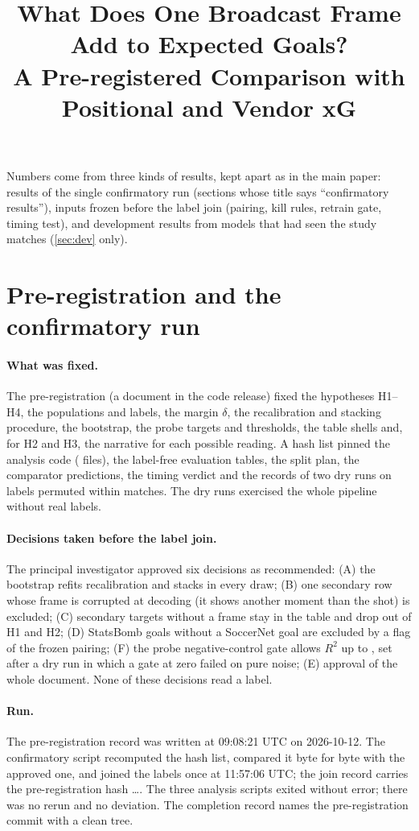 \documentclass[10pt,twocolumn,letterpaper]{article}
\title{What Does One Broadcast Frame Add to Expected Goals?\\A Pre-registered Comparison with Positional and Vendor xG}
\newcommand{\Hone}{H1\xspace}\newcommand{\Htwo}{H2\xspace}\newcommand{\Hthree}{H3\xspace}\newcommand{\Hfour}{H4\xspace}
\begin{document}
\maketitlesupplementary

Numbers come from three kinds of results, kept apart as in the main paper: results of the single confirmatory run (sections whose title says
``confirmatory results''), inputs frozen before the label join (pairing, kill rules, retrain gate, timing test), and
development results from models that had seen the study matches (\cref{sec:dev} only).

\section{Pre-registration and the confirmatory run}
\label{sec:prereg}

\paragraph{What was fixed.} The pre-registration (a document in the code release) fixed the hypotheses \Hone--\Hfour,
the populations and labels, the margin $\delta$, the recalibration and stacking procedure, the bootstrap, the probe
targets and thresholds, the table shells and, for \Htwo and \Hthree, the narrative for each possible reading. A hash
list pinned the analysis code ( files), the label-free evaluation tables, the split plan, the
comparator predictions, the timing verdict and the records of two dry runs on labels permuted within matches. The dry
runs exercised the whole pipeline without real labels.

\paragraph{Decisions taken before the label join.} The principal investigator approved six decisions as recommended:
(A) the bootstrap refits recalibration and stacks in every draw; (B) one secondary row whose frame is corrupted at
decoding (it shows another moment than the shot) is excluded; (C) secondary targets without a frame stay in the table
and drop out of \Hone and \Htwo; (D) StatsBomb goals without a SoccerNet goal are excluded by a flag of the frozen
pairing; (F) the probe negative-control gate allows $R^2$ up to , set after a dry run in which a
gate at zero failed on pure noise; (E) approval of the whole document. None of these decisions read a label.

\paragraph{Run.} The pre-registration record was written at 09:08:21 UTC on 2026-10-12. The confirmatory script
recomputed the hash list, compared it byte for byte with the approved one, and joined the labels once at 11:57:06 UTC;
the join record carries the pre-registration hash \ldots. The three analysis scripts exited
without error; there was no rerun and no deviation. The completion record names the pre-registration commit with a
clean tree.
\end{document}
